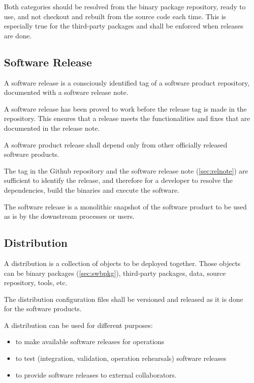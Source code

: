Both categories should be resolved from the binary package repository, ready to use, and not checkout and rebuilt from the source code each time.
This is especially true for the third-party packages and shall be enforced when releases are done.


\subsection{Software Release} \label{sec:swrel}

A software release is a consciously identified tag of a software product repository, documented with a software release note.

A software release has been proved to work before the release tag is made in the repository.
This ensures that a release meets the functionalities and fixes that are documented in the release note.

A software product release shall depend only from other officially released software products.

The tag in the Github repository and the software release note (\ref{sec:relnote}) are sufficient to identify the release, 
and therefore for a developer to resolve the dependencies, build the binaries and execute the software.

The software release is a monolithic snapshot of the software product to be used as is by the downstream processes or users.


\subsection{Distribution} \label{sec:distribution}

A distribution is a collection of objects to be deployed together.
Those objects can be binary packages (\ref{sec:swbpkg}), third-party packages, data, source repository, tools, etc.

The distribution configuration files shall be versioned and released as it is done for the software products.

A distribution can be used for different purposes:

\begin{itemize}
\item to make available software releases for operations
\item to test (integration, validation, operation rehearsals) software releases
\item to provide software releases to external collaborators.
\end{itemize}

